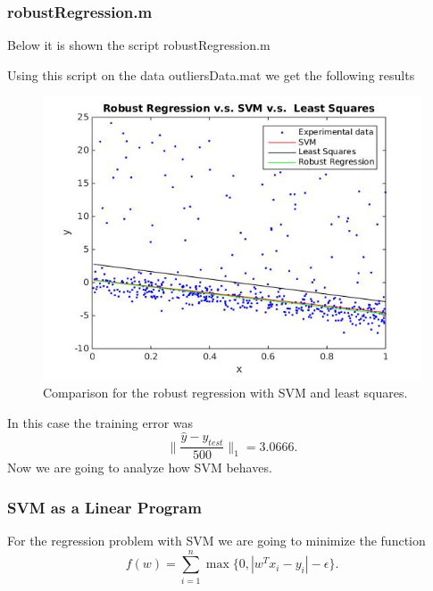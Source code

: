 \documentclass[11pt]{article}
\theoremstyle{plain}
\begin{document}
\subsubsection{robustRegression.m}
Below it is shown the script robustRegression.m

Using this script on the data outliersData.mat we get the following results
\begin{figure}[H]
\centering
\includegraphics[scale=0.7]{./Q23/regressions}
\caption{Comparison for the robust regression with SVM and least squares.}
\label{figregressions}
\end{figure}

In this case the training error was
\begin{equation*}
\|\frac{\hat{y}-y_{test}}{500}\|_{1}=3.0666.
\end{equation*}
Now we are going to analyze how SVM behaves.


\subsubsection{SVM as a Linear Program}

For the regression problem with SVM we are going to minimize the function
\begin{equation*}
f(w)=\sum_{i=1}^{n}\max\{0,|w^{T}x_{i}-y_{i}|-\epsilon\}.
\end{equation*}
\end{document}
